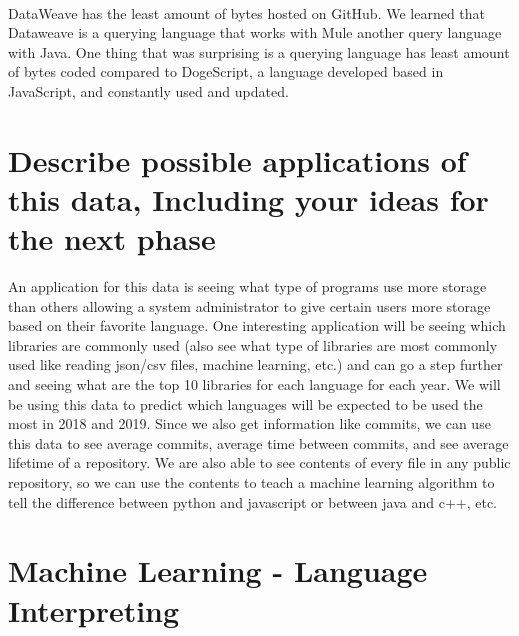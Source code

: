 \documentclass[11pt]{article}
\begin{document}
    \begin{center}
    \end{center}
    { \hspace*{\fill} \\}
    

    DataWeave has the least amount of bytes hosted on GitHub. We learned
that Dataweave is a querying language that works with Mule another query
language with Java. One thing that was surprising is a querying language
has least amount of bytes coded compared to DogeScript, a language
developed based in JavaScript, and constantly used and updated.

    \hypertarget{describe-possible-applications-of-this-data-including-your-ideas-for-the-next-phase}{%
\section{Describe possible applications of this data, Including your
ideas for the next
phase}\label{describe-possible-applications-of-this-data-including-your-ideas-for-the-next-phase}}

An application for this data is seeing what type of programs use more
storage than others allowing a system administrator to give certain
users more storage based on their favorite language. One interesting
application will be seeing which libraries are commonly used (also see
what type of libraries are most commonly used like reading json/csv
files, machine learning, etc.) and can go a step further and seeing what
are the top 10 libraries for each language for each year. We will be
using this data to predict which languages will be expected to be used
the most in 2018 and 2019. Since we also get information like commits,
we can use this data to see average commits, average time between
commits, and see average lifetime of a repository. We are also able to
see contents of every file in any public repository, so we can use the
contents to teach a machine learning algorithm to tell the difference
between python and javascript or between java and c++, etc.

    \hypertarget{machine-learning---language-interpreting}{%
\section{Machine Learning - Language
Interpreting}\label{machine-learning---language-interpreting}}
\end{document}
